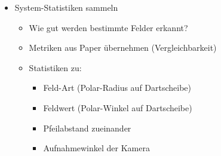 \begin{itemize}
    \item System-Statistiken sammeln
    \begin{itemize}
        \item Wie gut werden bestimmte Felder erkannt?
        \item Metriken aus Paper übernehmen (Vergleichbarkeit)
        \item Statistiken zu:
        \begin{itemize}
            \item Feld-Art (Polar-Radius auf Dartscheibe)
            \item Feldwert (Polar-Winkel auf Dartscheibe)
            \item Pfeilabstand zueinander
            \item Aufnahmewinkel der Kamera
        \end{itemize}
    \end{itemize}
\end{itemize}
\fi
